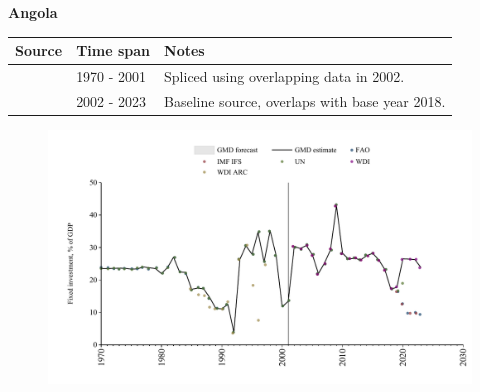 \documentclass[12pt,a4paper,landscape]{article}
\begin{document}
\begin{adjustbox}{max totalsize={\paperwidth}{\paperheight},center}
\begin{minipage}[t][\textheight][t]{\textwidth}
\vspace*{0.5cm}
{}
\begin{center}
{\Large\bfseries Angola}
\end{center}
\vspace{0.5cm}
\begin{table}[H]
\centering
\small
\begin{tabular}{|l|l|l|}
\hline
\textbf{Source} & \textbf{Time span} & \textbf{Notes} \\
\hline
\rowcolor{white}\cite{UN}& 1970 - 2001 &Spliced using overlapping data in 2002.\\
\rowcolor{lightgray}\cite{WDI}& 2002 - 2023 &Baseline source, overlaps with base year 2018.\\
\hline
\end{tabular}
\end{table}
\begin{figure}[H]
\centering
\includegraphics[width=\textwidth,height=0.6\textheight,keepaspectratio]{graphs/AGO_finv_GDP.pdf}
\end{figure}
\end{minipage}
\end{adjustbox}
\end{document}
